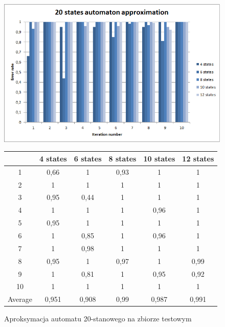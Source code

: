 \documentclass[runningheads,a4paper]{llncs}
\begin{document}
\begin{figure}[!htb]
\includegraphics[scale=0.92]{2.png}
\endminipage\hfill
\hspace{2.2cm}
\renewcommand{\arraystretch}{1.3}%
\begin{tabular}{@{}cccccc@{}}
\toprule
        & 4 states & 6 states & 8 states & 10 states & 12 states    \\ \midrule
1       & 0,66     & 1        & 0,93     & 1         & 1 \\
2       & 1        & 1        & 1        & 1         & 1 \\
3       & 0,95     & 0,44     & 1        & 1         & 1 \\
4       & 1        & 1        & 1        & 0,96      & 1   \\
5       & 0,95     & 1        & 1        & 1         & 1   \\
6       & 1        & 0,85     & 1        & 0,96      & 1    \\
7       & 1        & 0,98     & 1        & 1         & 1    \\
8       & 0,95     & 1        & 0,97     & 1         & 0,99     \\
9       & 1        & 0,81     & 1        & 0,95      & 0,92 \\
10      & 1        & 1        & 1        & 1         & 1  \\ \bottomrule
Average & 0,951    & 0,908    & 0,99     & 0,987     & 0,991  \\ \bottomrule
\end{tabular}
\vspace{4mm}
\endminipage\hfill
\caption{Aproksymacja automatu 20-stanowego na zbiorze testowym}
\end{figure}
\end{document}
